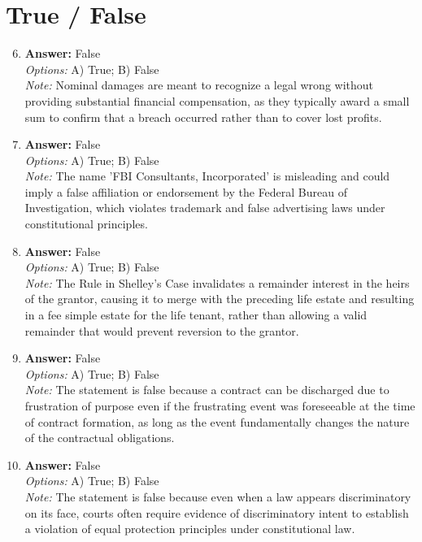 \documentclass[12pt]{article}
\begin{document}
\section*{True / False}
\begin{enumerate}[label=\arabic*.]
\setcounter{enumi}{5}
\item \textbf{Answer:} False
\\ \textit{Options:} A) True; B) False
\\ \textit{Note:} Nominal damages are meant to recognize a legal wrong without providing substantial financial compensation, as they typically award a small sum to confirm that a breach occurred rather than to cover lost profits.
\item \textbf{Answer:} False
\\ \textit{Options:} A) True; B) False
\\ \textit{Note:} The name 'FBI Consultants, Incorporated' is misleading and could imply a false affiliation or endorsement by the Federal Bureau of Investigation, which violates trademark and false advertising laws under constitutional principles.
\item \textbf{Answer:} False
\\ \textit{Options:} A) True; B) False
\\ \textit{Note:} The Rule in Shelley's Case invalidates a remainder interest in the heirs of the grantor, causing it to merge with the preceding life estate and resulting in a fee simple estate for the life tenant, rather than allowing a valid remainder that would prevent reversion to the grantor.
\item \textbf{Answer:} False
\\ \textit{Options:} A) True; B) False
\\ \textit{Note:} The statement is false because a contract can be discharged due to frustration of purpose even if the frustrating event was foreseeable at the time of contract formation, as long as the event fundamentally changes the nature of the contractual obligations.
\item \textbf{Answer:} False
\\ \textit{Options:} A) True; B) False
\\ \textit{Note:} The statement is false because even when a law appears discriminatory on its face, courts often require evidence of discriminatory intent to establish a violation of equal protection principles under constitutional law.
\end{enumerate}
\end{document}
